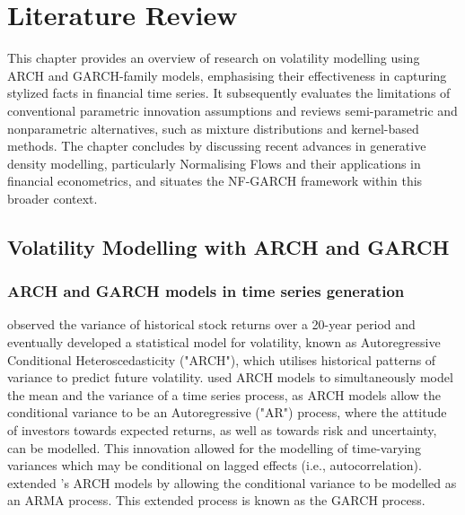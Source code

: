 \documentclass[oneside,12pt]{CUEDthesisPSnPDF}
\newcommand{\textcite}{\citet}
\begin{document}

\chapter{Literature Review}
\noindent
This chapter provides an overview of research on volatility modelling using ARCH and GARCH-family models, emphasising their effectiveness in capturing stylized facts in financial time series. It subsequently evaluates the limitations of conventional parametric innovation assumptions and reviews semi-parametric and nonparametric alternatives, such as mixture distributions and kernel-based methods. The chapter concludes by discussing recent advances in generative density modelling, particularly Normalising Flows and their applications in financial econometrics, and situates the NF-GARCH framework within this broader context.\\


\section{Volatility Modelling with ARCH and GARCH}
\subsection{ARCH and GARCH models in time series generation}
\noindent
\textcite{engle1982autoregressive} observed the variance of historical stock returns over a 20-year period and eventually developed a statistical model for volatility, known as Autoregressive Conditional Heteroscedasticity ("ARCH"), which utilises historical patterns of variance to predict future volatility. \textcite{engle1982autoregressive} used ARCH models to simultaneously model the mean and the variance of a time series process, as ARCH models allow the conditional variance to be an Autoregressive ("AR") process, where the attitude of investors towards expected returns, as well as towards risk and uncertainty, can be modelled. This innovation allowed for the modelling of time-varying variances which may be conditional on lagged effects (i.e., autocorrelation). \textcite{bollerslev1986generalised} extended \textcite{engle1982autoregressive}'s ARCH models by allowing the conditional variance to be modelled as an ARMA process. This extended process is known as the GARCH process.\\
\end{document}
